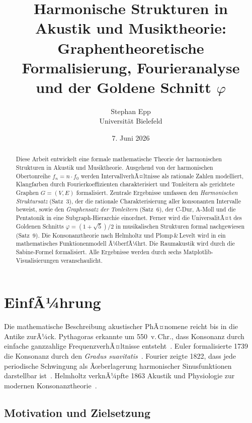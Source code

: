 ﻿\documentclass[a4paper,12pt]{article}
\title{Harmonische Strukturen in Akustik und Musiktheorie:\\
Graphentheoretische Formalisierung, Fourieranalyse\\
und der Goldene Schnitt $\varphi$}
\author{Stephan Epp\\
\small Universit\"at Bielefeld}
\date{7. Juni 2026}
\theoremstyle{definition}
\begin{document}
\maketitle

\begin{abstract}
Diese Arbeit entwickelt eine formale mathematische Theorie der harmonischen Strukturen
in Akustik und Musiktheorie. Ausgehend von der harmonischen Obertonreihe
$f_n = n \cdot f_0$ werden IntervallverhÃ¤ltnisse als rationale Zahlen modelliert,
Klangfarben durch Fourierkoeffizienten charakterisiert und Tonleitern als
gerichtete Graphen $G = (V, E)$ formalisiert. Zentrale Ergebnisse umfassen den
\emph{Harmonischen Struktursatz} (Satz~3), der die rationale Charakterisierung aller
konsonanten Intervalle beweist, sowie den \emph{Graphensatz der Tonleitern} (Satz~6),
der C-Dur, A-Moll und die Pentatonik in eine Subgraph-Hierarchie einordnet.
Ferner wird die UniversalitÃ¤t des Goldenen Schnitts $\varphi = (1+\sqrt{5})/2$
in musikalischen Strukturen formal nachgewiesen (Satz~9). Die Konsonanztheorie
nach Helmholtz und Plomp\,\&\,Levelt wird in ein mathematisches Funktionenmodell
Ã¼berfÃ¼hrt. Die Raumakustik wird durch die Sabine-Formel formalisiert. Alle
Ergebnisse werden durch sechs Matplotlib-Visualisierungen veranschaulicht.
\end{abstract}

\tableofcontents
\newpage

\section{EinfÃ¼hrung}

Die mathematische Beschreibung akustischer PhÃ¤nomene reicht bis in die Antike zurÃ¼ck.
Pythagoras erkannte um 550~v.\,Chr., dass Konsonanz durch einfache ganzzahlige
FrequenzverhÃ¤ltnisse entsteht~\cite{pythagoras}. Euler formalisierte 1739 die Konsonanz
durch den \emph{Gradus suavitatis}~\cite{euler1739}. Fourier zeigte 1822, dass jede
periodische Schwingung als Ãœberlagerung harmonischer Sinusfunktionen darstellbar
ist~\cite{fourier1822}. Helmholtz verknÃ¼pfte 1863 Akustik und Physiologie zur modernen
Konsonanztheorie~\cite{helmholtz1863}.

\subsection{Motivation und Zielsetzung}
\end{document}
